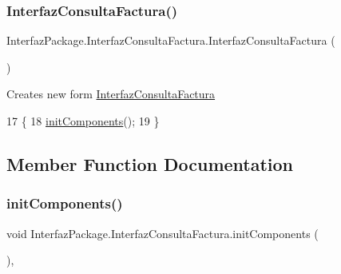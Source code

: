 \subsubsection{\texorpdfstring{Interfaz\+Consulta\+Factura()}{InterfazConsultaFactura()}}
{\footnotesize\ttfamily Interfaz\+Package.\+Interfaz\+Consulta\+Factura.\+Interfaz\+Consulta\+Factura (\begin{DoxyParamCaption}{ }\end{DoxyParamCaption})\hspace{0.3cm}{\ttfamily [inline]}}

Creates new form \mbox{\hyperlink{class_interfaz_package_1_1_interfaz_consulta_factura}{Interfaz\+Consulta\+Factura}} 
\begin{DoxyCode}
17                                      \{
18         \mbox{\hyperlink{class_interfaz_package_1_1_interfaz_consulta_factura_a8c15050ad9e2115a11c3b06337c9bef2}{initComponents}}();
19     \}
\end{DoxyCode}


\subsection{Member Function Documentation}
\mbox{\label{class_interfaz_package_1_1_interfaz_consulta_factura_a8c15050ad9e2115a11c3b06337c9bef2}} 
\subsubsection{\texorpdfstring{init\+Components()}{initComponents()}}
{\footnotesize\ttfamily void Interfaz\+Package.\+Interfaz\+Consulta\+Factura.\+init\+Components (\begin{DoxyParamCaption}{ }\end{DoxyParamCaption})\hspace{0.3cm}{\ttfamily [inline]}, {\ttfamily [private]}}

